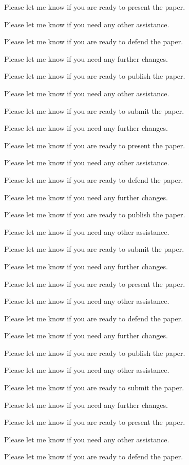 Please let me know if you are ready to present the paper. 

Please let me know if you need any other assistance. 

Please let me know if you are ready to defend the paper. 

Please let me know if you need any further changes. 

Please let me know if you are ready to publish the paper. 

Please let me know if you need any other assistance. 

Please let me know if you are ready to submit the paper. 

Please let me know if you need any further changes. 

Please let me know if you are ready to present the paper. 

Please let me know if you need any other assistance. 

Please let me know if you are ready to defend the paper. 

Please let me know if you need any further changes. 

Please let me know if you are ready to publish the paper. 

Please let me know if you need any other assistance. 

Please let me know if you are ready to submit the paper. 

Please let me know if you need any further changes. 

Please let me know if you are ready to present the paper. 

Please let me know if you need any other assistance. 

Please let me know if you are ready to defend the paper. 

Please let me know if you need any further changes. 

Please let me know if you are ready to publish the paper. 

Please let me know if you need any other assistance. 

Please let me know if you are ready to submit the paper. 

Please let me know if you need any further changes. 

Please let me know if you are ready to present the paper. 

Please let me know if you need any other assistance. 

Please let me know if you are ready to defend the paper. 

